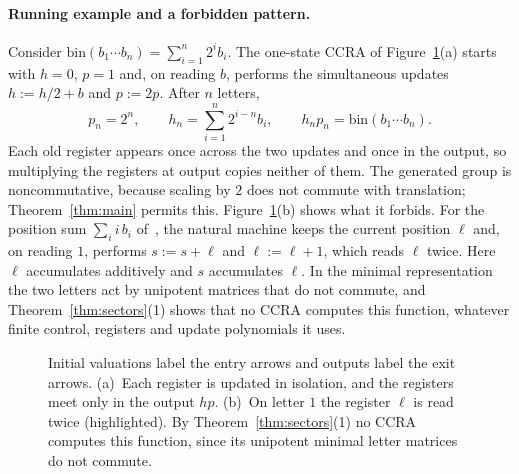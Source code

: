 \documentclass[11pt,letterpaper]{article}
\newcommand{\bin}{\mathrm{bin}}
\theoremstyle{definition}
\begin{document}
\paragraph{Running example and a forbidden pattern.}
Consider $\bin(b_1\cdots b_n)=\sum_{i=1}^n2^i b_i$. The one-state CCRA of Figure~\ref{fig:machine}(a) starts with $h=0$, $p=1$ and, on reading $b$, performs the simultaneous updates $h:=h/2+b$ and $p:=2p$. After $n$ letters,
\[
p_n=2^n,\qquad h_n=\sum_{i=1}^n2^{i-n}b_i,\qquad h_np_n=\bin(b_1\cdots b_n).
\]
Each old register appears once across the two updates and once in the output, so multiplying the registers at output copies neither of them. The generated group is noncommutative, because scaling by $2$ does not commute with translation; Theorem~\ref{thm:main} permits this. Figure~\ref{fig:machine}(b) shows what it forbids. For the position sum $\sum_i i\,b_i$ of~\cite[Example~26]{MPS26}, the natural machine keeps the current position $\ell$ and, on reading $1$, performs $s:=s+\ell$ and $\ell:=\ell+1$, which reads $\ell$ twice. Here $\ell$ accumulates additively and $s$ accumulates $\ell$. In the minimal representation the two letters act by unipotent matrices that do not commute, and Theorem~\ref{thm:sectors}(1) shows that no CCRA computes this function, whatever finite control, registers and update polynomials it uses.

\begin{figure}[t]
\centering
{}
\caption{Initial valuations label the entry arrows and outputs label the exit arrows. (a)~Each register is updated in isolation, and the registers meet only in the output $hp$. (b)~On letter $1$ the register $\ell$ is read twice (highlighted). By Theorem~\ref{thm:sectors}(1) no CCRA computes this function, since its unipotent minimal letter matrices do not commute.}\label{fig:machine}
\end{figure}
\end{document}
